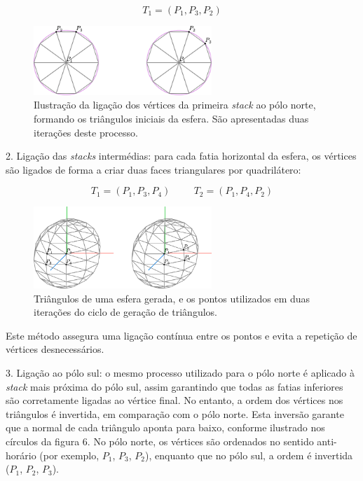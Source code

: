 \documentclass[12pt, a4paper]{article}
\begin{document}
$$
T_1 = (P_1, P_3, P_2)
$$

\begin{figure}[H]
    \centering
    \includegraphics[width=0.6\textwidth]{res/figures/polosSphere.pdf}
    \caption{
        \onehalfspacing
        Ilustração da ligação dos vértices da primeira \emph{stack} ao pólo norte, formando os
        triângulos iniciais da esfera. São apresentadas duas iterações deste processo.
    }
\end{figure}

2. Ligação das \emph{stacks} intermédias: para cada fatia horizontal da esfera, os vértices são
ligados de forma a criar duas faces triangulares por quadrilátero:

$$
T_1 = (P_1, P_3, P_4)
\hspace{1cm}
T_2 = (P_1, P_4, P_2)
$$

\begin{figure}[H]
    \centering
    \includegraphics[width=0.6\textwidth]{res/figures/sphere.pdf}
    \caption{
        \onehalfspacing
        Triângulos de uma esfera gerada, e os pontos utilizados em duas iterações do ciclo de
        geração de triângulos.
    }
\end{figure}

Este método assegura uma ligação contínua entre os pontos e evita a repetição de vértices
desnecessários.

3. Ligação ao pólo sul: o mesmo processo utilizado para o pólo norte é aplicado à \emph{stack} mais
próxima do pólo sul, assim garantindo que todas as fatias inferiores são corretamente ligadas ao
vértice final. No entanto, a ordem dos vértices nos triângulos é invertida, em comparação com o pólo
norte. Esta inversão garante que a normal de cada triângulo aponta para baixo, conforme ilustrado
nos círculos da figura 6. No pólo norte, os vértices são ordenados no sentido anti-horário (por
exemplo, $P_1$, $P_3$, $P_2$), enquanto que no pólo sul, a ordem é invertida ($P_1$, $P_2$, $P_3$).
\end{document}

